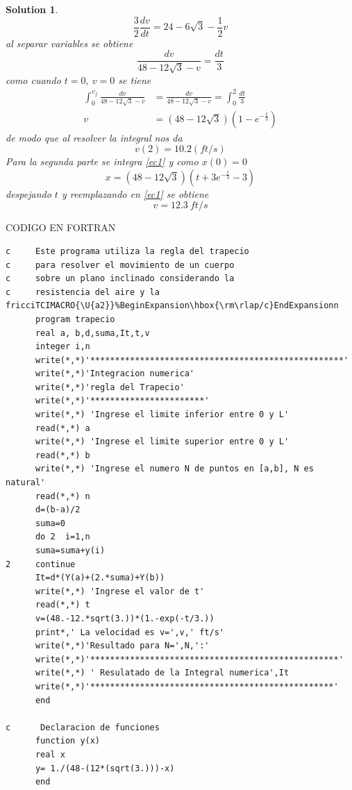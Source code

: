 \documentclass{article}%
\newtheorem{solution}[theorem]{Solution}
\begin{document}
\begin{solution}
\[
\frac{3}{2}\frac{dv}{dt}=24-6\sqrt{3}-\frac{1}{2}v
\]
al separar variables se obtiene%
\[
\frac{dv}{48-12\sqrt{3}-v}=\frac{dt}{3}%
\]
como cuando $t=0,\ v=0$ se tiene%
\begin{align}
\int_{0}^{v_{f}}\frac{dv}{48-12\sqrt{3}-v} &  =\frac{dv}{48-12\sqrt{3}-v}%
=\int_{0}^{2}\frac{dt}{3}\label{ec1}\\
v &  =\left(  48-12\sqrt{3}\right)  \left(  1-e^{-\frac{t}{3}}\right)
\nonumber
\end{align}
de modo que al resolver la integral nos da
\[
v\left(  2\right)  =10.2\left(  ft/s\right)
\]
Para la segunda parte se integra \ref{ec1} y como $x\left(  0\right)  =0$%
\[
x=\left(  48-12\sqrt{3}\right)  \left(  t+3e^{-\frac{t}{3}}-3\right)
\]
despejando $t$ y reemplazando en \ref{ec1} se obtiene
\[
v=12.3~ft/s
\]
\end{solution}

CODIGO EN FORTRAN
\begin{verbatim}
c     Este programa utiliza la regla del trapecio
c     para resolver el movimiento de un cuerpo
c     sobre un plano inclinado considerando la
c     resistencia del aire y la fricciTCIMACRO{\U{a2}}%BeginExpansion\hbox{\rm\rlap/c}EndExpansionn
      program trapecio
      real a, b,d,suma,It,t,v
      integer i,n
      write(*,*)'***************************************************'
      write(*,*)'Integracion numerica'
      write(*,*)'regla del Trapecio'
      write(*,*)'***********************'
      write(*,*) 'Ingrese el limite inferior entre 0 y L'
      read(*,*) a
      write(*,*) 'Ingrese el limite superior entre 0 y L'
      read(*,*) b
      write(*,*) 'Ingrese el numero N de puntos en [a,b], N es natural'
      read(*,*) n
      d=(b-a)/2
      suma=0
      do 2  i=1,n
      suma=suma+y(i)
2     continue
      It=d*(Y(a)+(2.*suma)+Y(b))
      write(*,*) 'Ingrese el valor de t'
      read(*,*) t
      v=(48.-12.*sqrt(3.))*(1.-exp(-t/3.))
      print*,' La velocidad es v=',v,' ft/s'
      write(*,*)'Resultado para N=',N,':'
      write(*,*)'**************************************************'
      write(*,*) ' Resulatado de la Integral numerica',It
      write(*,*)'*************************************************'
      end
      
c      Declaracion de funciones
      function y(x)
      real x
      y= 1./(48-(12*(sqrt(3.)))-x)
      end
      
      

      
\end{verbatim}
\end{document}
